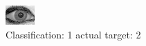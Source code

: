 \begin{figure}[h!]
\begin{center}
\includegraphics[width=0.60\columnwidth]{figures/ID1989_class_1_target_2.png}
\end{center}
\caption{ Classification: 1 actual target: 2}
\label{fig:ID1989_class_1_target_2}
\end{figure}
